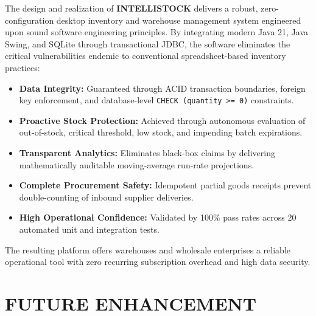 \documentclass[BTech]{srmuthesis}
\begin{document}
The design and realization of \textbf{INTELLISTOCK} delivers a robust, zero-configuration desktop inventory and warehouse management system engineered upon sound software engineering principles. By integrating modern Java 21, Java Swing, and SQLite through transactional JDBC, the software eliminates the critical vulnerabilities endemic to conventional spreadsheet-based inventory practices:
\begin{itemize}
    \item \textbf{Data Integrity:} Guaranteed through ACID transaction boundaries, foreign key enforcement, and database-level \texttt{CHECK (quantity >= 0)} constraints.
    \item \textbf{Proactive Stock Protection:} Achieved through autonomous evaluation of out-of-stock, critical threshold, low stock, and impending batch expirations.
    \item \textbf{Transparent Analytics:} Eliminates black-box claims by delivering mathematically auditable moving-average run-rate projections.
    \item \textbf{Complete Procurement Safety:} Idempotent partial goods receipts prevent double-counting of inbound supplier deliveries.
    \item \textbf{High Operational Confidence:} Validated by 100\% pass rates across 20 automated unit and integration tests.
\end{itemize}

The resulting platform offers warehouses and wholesale enterprises a reliable operational tool with zero recurring subscription overhead and high data security.

\chapter{FUTURE ENHANCEMENT}
\label{chap:future}
\end{document}

